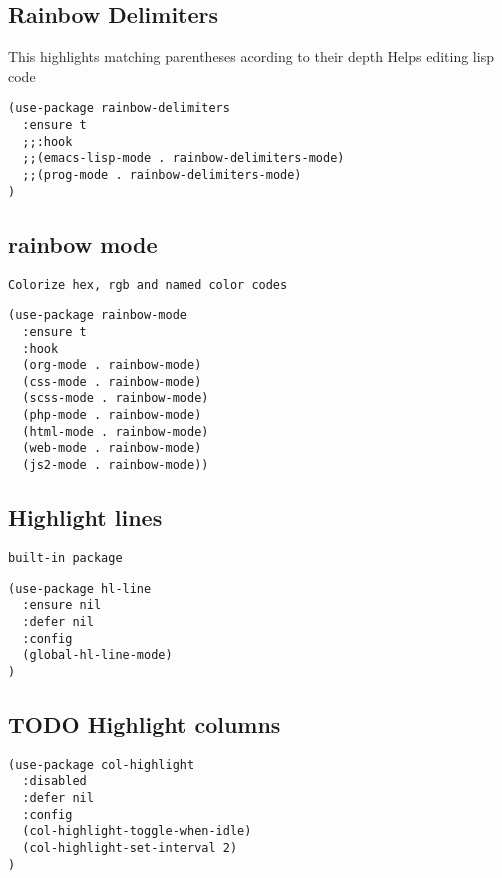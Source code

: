 \documentclass[11pt]{article}
\begin{document}
\subsection*{Rainbow Delimiters}
\label{sec:org3e798bc}

This highlights matching parentheses acording to their depth
Helps editing lisp code

\begin{verbatim}
(use-package rainbow-delimiters
  :ensure t
  ;;:hook
  ;;(emacs-lisp-mode . rainbow-delimiters-mode)
  ;;(prog-mode . rainbow-delimiters-mode)
)
\end{verbatim}

\subsection*{rainbow mode}
\label{sec:org3148cc7}

\begin{verbatim}
Colorize hex, rgb and named color codes
\end{verbatim}


\begin{verbatim}
(use-package rainbow-mode
  :ensure t
  :hook
  (org-mode . rainbow-mode)
  (css-mode . rainbow-mode)
  (scss-mode . rainbow-mode)
  (php-mode . rainbow-mode)
  (html-mode . rainbow-mode)
  (web-mode . rainbow-mode)
  (js2-mode . rainbow-mode))
\end{verbatim}

\subsection*{Highlight lines}
\label{sec:org100260c}

\begin{verbatim}
built-in package
\end{verbatim}


\begin{verbatim}
(use-package hl-line
  :ensure nil
  :defer nil
  :config
  (global-hl-line-mode)
)
\end{verbatim}

\subsection*{{\bfseries\sffamily TODO} Highlight columns}
\label{sec:org72dd254}

\begin{verbatim}
(use-package col-highlight
  :disabled
  :defer nil
  :config
  (col-highlight-toggle-when-idle)
  (col-highlight-set-interval 2)
)
\end{verbatim}
\end{document}
